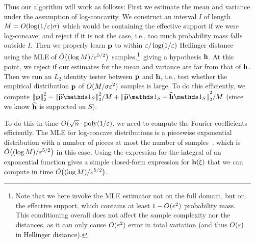 Thus our algorithm will work as follows: First we estimate the mean and variance under the assumption of log-concavity. 
We construct an interval $I$ of length $M=O(\log(1/\varepsilon) \sigma)$ which would be containing the effective support if we were log-concave; 
and reject if it is not the case, i.e., too much probability mass falls outside $I$. Then we properly learn $\mathbf{p}$ to within $\varepsilon/\log(1/\varepsilon)$ Hellinger distance 
using the MLE of $\tildeO{(\log M)/\eps^{5/2}}$ samples,\footnote{Note that we here invoke the MLE estimator not on the full domain, but on the effective support, which contains at least $1-O(\varepsilon^2)$ probability mass. This conditioning overall does not affect the sample complexity nor the distances, as it can only cause $O(\varepsilon^2)$ error in total variation (and thus $O(\varepsilon)$ in Hellinger distance).}\ giving a hypothesis $\mathbf{h}$. At this point, we reject if our estimates for the mean and variance 
are far from that of $\mathbf{h}$. Then we run an $L_2$ identity tester between $\mathbf{p}$ and $\mathbf{h}$, i.e., test whether the empirical distribution $\mathbf{p}$ of $O(M/\sigma\varepsilon^2)$ samples is large. 
To do this efficiently, we compute $\normtwo{\q}^2-\normtwo{\fourier{\q}\indicSet{S}}^2/M + \normtwo{\fourier{\q}\indicSet{S}-\fourier{\h}\indicSet{S}}^2/M$ 
(since we know $\widehat{\mathbf{h}}$ is supported on $S$).

To do this in time $O(\sqrt{n} \cdot \operatorname*{poly}(1/\varepsilon)$, we need to compute the Fourier coefficients efficiently. The MLE for log-concave distributions 
is a piecewise exponential distribution with a number of pieces at most the number of samples~\cite{DR:11}, 
which is $\tildeO{(\log M)/\eps^{5/2}}$ in this case. Using the expression for the integral of an exponential function 
gives a simple closed-form expression for $\mathbf{h}(\xi)$ that we can compute in time $\tildeO{(\log M)/\eps^{5/2}}$.



